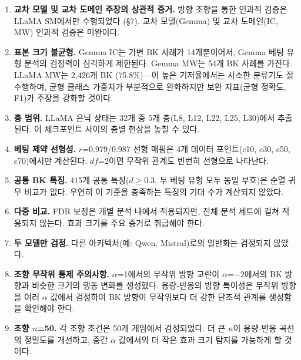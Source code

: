 \documentclass[11pt,a4paper]{article}
\begin{document}
\begin{enumerate}[leftmargin=2em]
    \item \textbf{교차 모델 및 교차 도메인 주장의 상관적 증거.} 방향 조향을 통한 인과적 검증은 LLaMA SM에서만 수행되었다 (\S7). 교차 모델(Gemma) 및 교차 도메인(IC, MW) 인과적 검증은 미완이다.

    \item \textbf{표본 크기 불균형.} Gemma IC는 가변 BK 사례가 14개뿐이어서, Gemma 베팅 유형 분석의 검정력이 심각하게 제한된다. Gemma MW는 54개 BK 사례를 가진다. LLaMA MW는 2{,}426개 BK (75.8\%)---이 높은 기저율에서는 사소한 분류기도 잘 수행하며, 균형 클래스 가중치가 부분적으로 완화하지만 보완 지표(균형 정확도, F1)가 주장을 강화할 것이다.

    \item \textbf{층 범위.} LLaMA 은닉 상태는 32개 중 5개 층(L8, L12, L22, L25, L30)에서 추출된다. 이 체크포인트 사이의 층별 현상을 놓칠 수 있다.

    \item \textbf{베팅 제약 선형성.} $r$=0.979/0.987 선형 매핑은 4개 데이터 포인트(c10, c30, c50, c70)에서만 계산된다. $df$=2이면 무작위 관계도 빈번히 선형으로 나타난다.

    \item \textbf{공통 BK 특징.} 415개 공통 특징($d$$\geq$0.3, 두 베팅 유형 모두 동일 부호)은 순열 귀무 비교가 없다. 우연히 이 기준을 충족하는 특징의 기대 수가 계산되지 않았다.

    \item \textbf{다중 비교.} FDR 보정은 개별 분석 내에서 적용되지만, 전체 분석 세트에 걸쳐 적용되지 않는다. 효과 크기를 주요 증거로 취급해야 한다.

    \item \textbf{두 모델만 검정.} 다른 아키텍처(예: Qwen, Mistral)로의 일반화는 검정되지 않았다.

    \item \textbf{조향 무작위 통제 주의사항.} $\alpha$=1에서의 무작위 방향 교란이 $\alpha$=$-$2에서의 BK 방향과 비슷한 크기의 행동 변화를 생성했다. 용량-반응의 방향 특이성은 무작위 방향을 여러 $\alpha$ 값에서 검정하여 BK 방향이 무작위보다 더 강한 단조적 관계를 생성함을 확인해야 한다.

    \item \textbf{조향 $n$=50.} 각 조향 조건은 50개 게임에서 검정되었다. 더 큰 $n$이 용량-반응 곡선의 정밀도를 개선하고, 중간 $\alpha$ 값에서의 더 작은 효과 크기 탐지를 가능하게 할 것이다.
\end{enumerate}
\end{document}
